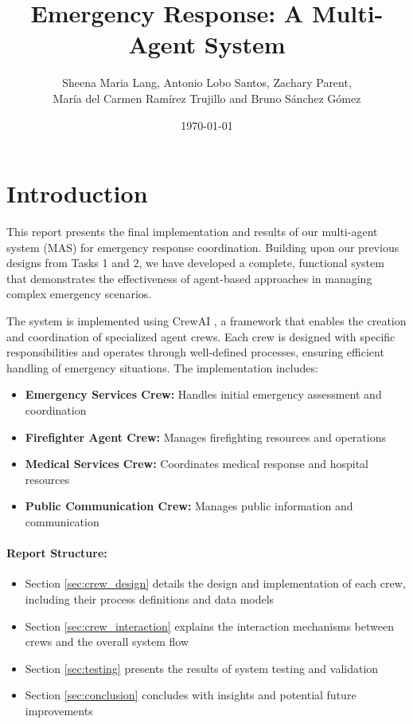 \documentclass[a4paper]{article}
\title{Emergency Response: A Multi-Agent System}
\author{Sheena Maria Lang, Antonio Lobo Santos, Zachary Parent, \\ María del Carmen Ramírez Trujillo and Bruno Sánchez Gómez}
\date{\today}
\begin{document}
\maketitle
\tableofcontents
\newpage

\section{Introduction}
This report presents the final implementation and results of our multi-agent system (MAS) for emergency response coordination. Building upon our previous designs from Tasks 1 and 2, we have developed a complete, functional system that demonstrates the effectiveness of agent-based approaches in managing complex emergency scenarios.

The system is implemented using CrewAI \cite{crewai}, a framework that enables the creation and coordination of specialized agent crews. Each crew is designed with specific responsibilities and operates through well-defined processes, ensuring efficient handling of emergency situations. The implementation includes:

\begin{itemize}
    \item \textbf{Emergency Services Crew:} Handles initial emergency assessment and coordination
    \item \textbf{Firefighter Agent Crew:} Manages firefighting resources and operations
    \item \textbf{Medical Services Crew:} Coordinates medical response and hospital resources
    \item \textbf{Public Communication Crew:} Manages public information and communication
\end{itemize}

\paragraph{Report Structure:}
\begin{itemize}
    \item Section \ref{sec:crew_design} details the design and implementation of each crew, including their process definitions and data models
    \item Section \ref{sec:crew_interaction} explains the interaction mechanisms between crews and the overall system flow
    \item Section \ref{sec:testing} presents the results of system testing and validation
    \item Section \ref{sec:conclusion} concludes with insights and potential future improvements
\end{itemize}
\end{document}
